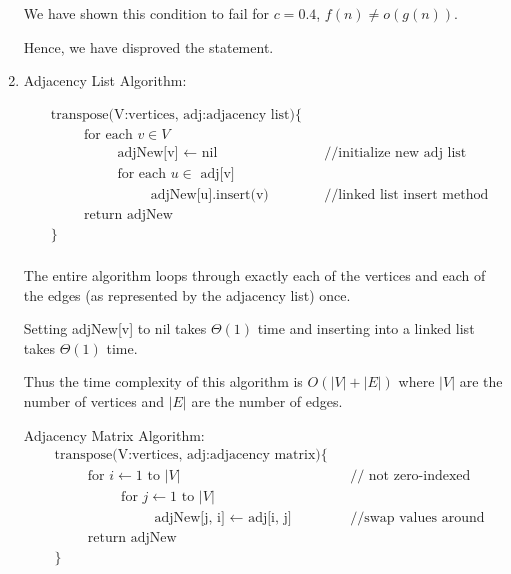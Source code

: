 \documentclass[a4paper]{report}
\begin{document}
\begin{enumerate}
      We have shown this condition to fail for $c = 0.4$, $f(n) \neq o(g(n))$.

      Hence, we have disproved the statement.

    \bigskip
    \setcounter{equation}{0}
    \item 
      Adjacency List Algorithm:

      \begin{align*}
        &\text{transpose(V:vertices, adj:adjacency list)\{} \\
        & \hspace{1cm} \text{for each $v \in V$} \\
        & \hspace{2cm} \text{adjNew[v] $\leftarrow$ nil}  &&\text{//initialize new adj list} \\
        & \hspace{2cm} \text{for each $u \in $ adj[v]} \\
        & \hspace{3cm} \text{adjNew[u].insert(v)} &&\text{//linked list insert method}\\
        & \hspace{1cm} \text{return adjNew} \\
        &\text{\}} \\
      \end{align*}

      The entire algorithm loops through exactly each of the vertices and each of the edges (as represented by the adjacency list) once.

      Setting adjNew[v] to nil takes $\Theta(1)$ time and inserting into a linked list takes $\Theta(1)$ time.

      Thus the time complexity of this algorithm is $O(|V| + |E|)$ where $|V|$ are the number of vertices and $|E|$ are the number of edges.

      \bigskip
      Adjacency Matrix Algorithm:
      \begin{align*}
        &\text{transpose(V:vertices, adj:adjacency matrix)\{} \\
        & \hspace{1cm} \text{for $i \leftarrow 1$ to $|V|$} &&\text{// not zero-indexed}\\
        & \hspace{2cm} \text{for $j \leftarrow 1$ to $|V|$} \\
        & \hspace{3cm} \text{adjNew[j, i] $\leftarrow$ adj[i, j]} &&\text{//swap values around}\\
        & \hspace{1cm} \text{return adjNew} \\
        &\text{\}} \\
      \end{align*}


\end{enumerate}
\end{document}
